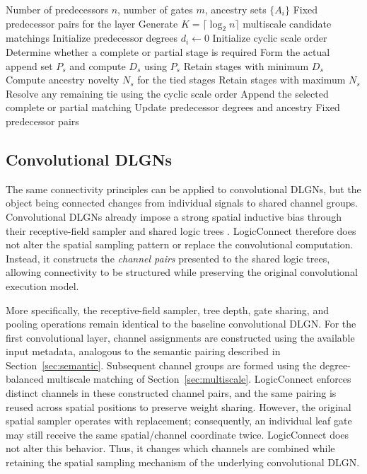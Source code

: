 \begin{algorithm}[t]
\caption{Degree-Balanced Multiscale Matching}
\label{alg:construction}
\begin{algorithmic}[1]
\REQUIRE Number of predecessors $n$, number of gates $m$, ancestry sets
$\{A_i\}$
\ENSURE Fixed predecessor pairs for the layer
\STATE Generate $K=\lceil\log_2 n\rceil$ multiscale candidate matchings
\STATE Initialize predecessor degrees $d_i\leftarrow 0$
\STATE Initialize cyclic scale order
    \STATE Determine whether a complete or partial stage is required
        \STATE Form the actual append set $P_s$ and compute $D_s$ using $P_s$
    \ENDFOR
    \STATE Retain stages with minimum $D_s$
        \STATE Compute ancestry novelty $N_s$ for the tied stages
        \STATE Retain stages with maximum $N_s$
    \ENDIF
    \STATE Resolve any remaining tie using the cyclic scale order
    \STATE Append the selected complete or partial matching
    \STATE Update predecessor degrees and ancestry
\ENDWHILE
\RETURN Fixed predecessor pairs
\end{algorithmic}
\end{algorithm}


\subsection{Convolutional DLGNs}
\label{sec:conv}

The same connectivity principles can be applied to convolutional DLGNs, but
the object being connected changes from individual signals to shared channel
groups. Convolutional DLGNs already impose a strong spatial inductive bias
through their receptive-field sampler and shared logic trees
\cite{petersen2024}. LogicConnect therefore does not alter the spatial
sampling pattern or replace the convolutional computation. Instead, it
constructs the \emph{channel pairs} presented to the shared logic trees,
allowing connectivity to be structured while preserving the original
convolutional execution model.

More specifically, the receptive-field sampler, tree depth, gate sharing,
and pooling operations remain identical to the baseline convolutional DLGN.
For the first convolutional layer, channel assignments are constructed using
the available input metadata, analogous to the semantic pairing described in
Section~\ref{sec:semantic}. Subsequent channel groups are formed using the
degree-balanced multiscale matching of
Section~\ref{sec:multiscale}. LogicConnect enforces distinct channels in
these constructed channel pairs, and the same pairing is reused across
spatial positions to preserve weight sharing. However, the original spatial
sampler operates with replacement; consequently, an individual leaf gate may
still receive the same spatial/channel coordinate twice. LogicConnect does
not alter this behavior. Thus, it changes which channels are combined while
retaining the spatial sampling mechanism of the underlying convolutional
DLGN.

